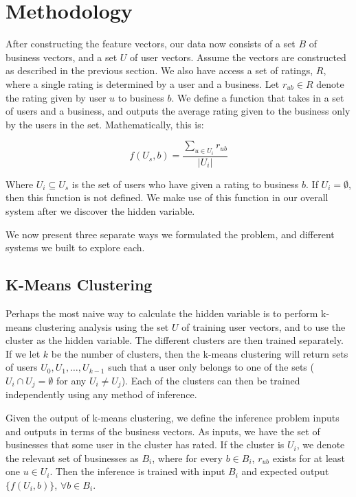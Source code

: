 \documentclass[11pt]{article}
\begin{document}
\section{Methodology}
After constructing the feature vectors, our data now consists of a set $B$ of business vectors, and a set $U$ of user vectors. Assume the vectors are constructed as described in the previous section. We also have access a set of ratings, $R$, where a single rating is determined by a user and a business. Let $r_{ub} \in R$ denote the rating given by user $u$ to business $b$. We define a function that takes in a set of users and a business, and outputs the average rating given to the business only by the users in the set. Mathematically, this is:

\begin{equation}
\label{basic}
f(U_s, b) = \frac{\sum\limits_{u \in U_i} r_{ub}}{|U_i|}
\end{equation}

Where $U_i \subseteq U_s$ is the set of users who have given a rating to business $b$. If $U_i = \emptyset$, then this function is not defined. We make use of this function in our overall system after we discover the hidden variable.

We now present three separate ways we formulated the problem, and different systems we built to explore each.

\subsection{K-Means Clustering}
Perhaps the most naive way to calculate the hidden variable is to perform k-means clustering analysis using the set $U$ of training user vectors, and to use the cluster as the hidden variable. The different clusters are then trained separately. If we let $k$ be the number of clusters, then the k-means clustering will return sets of users $U_0, U_1, \ldots, U_{k-1}$ such that a user only belongs to one of the sets ($U_i \cap U_j = \emptyset$ for any $U_i \neq U_j$). Each of the clusters can then be trained independently using any method of inference.

Given the output of k-means clustering, we define the inference problem inputs and outputs in terms of the business vectors. As inputs, we have the set of businesses that some user in the cluster has rated. If the cluster is $U_i$, we denote the relevant set of businesses as $B_i$, where for every $b \in B_i$, $r_{ub}$ exists for at least one $u \in U_i$. Then the inference is trained with input $B_i$ and expected output $\{f(U_i, b)\}$, $\forall b \in B_i$.
\end{document}
